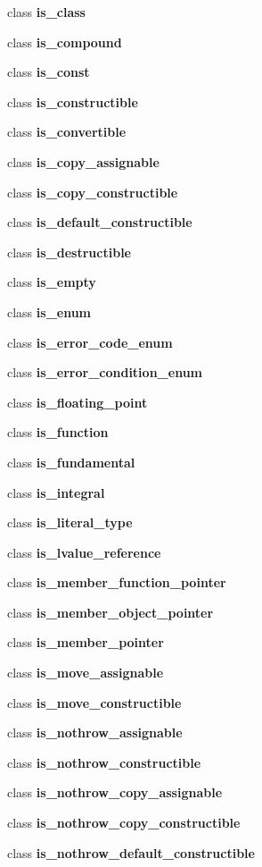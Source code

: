 \begin{DoxyCompactItemize}
\item 
class \textbf{ is\+\_\+class}
\item 
class \textbf{ is\+\_\+compound}
\item 
class \textbf{ is\+\_\+const}
\item 
class \textbf{ is\+\_\+constructible}
\item 
class \textbf{ is\+\_\+convertible}
\item 
class \textbf{ is\+\_\+copy\+\_\+assignable}
\item 
class \textbf{ is\+\_\+copy\+\_\+constructible}
\item 
class \textbf{ is\+\_\+default\+\_\+constructible}
\item 
class \textbf{ is\+\_\+destructible}
\item 
class \textbf{ is\+\_\+empty}
\item 
class \textbf{ is\+\_\+enum}
\item 
class \textbf{ is\+\_\+error\+\_\+code\+\_\+enum}
\item 
class \textbf{ is\+\_\+error\+\_\+condition\+\_\+enum}
\item 
class \textbf{ is\+\_\+floating\+\_\+point}
\item 
class \textbf{ is\+\_\+function}
\item 
class \textbf{ is\+\_\+fundamental}
\item 
class \textbf{ is\+\_\+integral}
\item 
class \textbf{ is\+\_\+literal\+\_\+type}
\item 
class \textbf{ is\+\_\+lvalue\+\_\+reference}
\item 
class \textbf{ is\+\_\+member\+\_\+function\+\_\+pointer}
\item 
class \textbf{ is\+\_\+member\+\_\+object\+\_\+pointer}
\item 
class \textbf{ is\+\_\+member\+\_\+pointer}
\item 
class \textbf{ is\+\_\+move\+\_\+assignable}
\item 
class \textbf{ is\+\_\+move\+\_\+constructible}
\item 
class \textbf{ is\+\_\+nothrow\+\_\+assignable}
\item 
class \textbf{ is\+\_\+nothrow\+\_\+constructible}
\item 
class \textbf{ is\+\_\+nothrow\+\_\+copy\+\_\+assignable}
\item 
class \textbf{ is\+\_\+nothrow\+\_\+copy\+\_\+constructible}
\item 
class \textbf{ is\+\_\+nothrow\+\_\+default\+\_\+constructible}

\end{DoxyCompactItemize}
